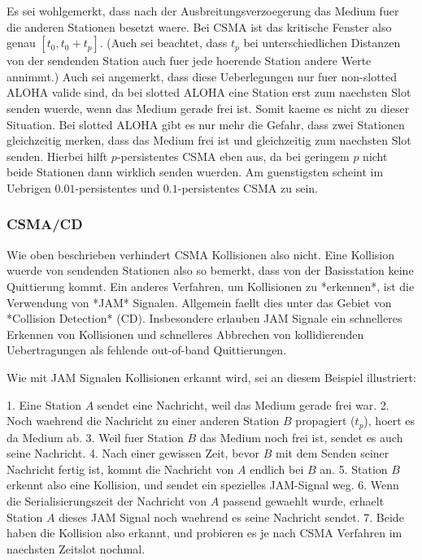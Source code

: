 Es sei wohlgemerkt, dass nach der Ausbreitungsverzoegerung das Medium fuer die
anderen Stationen besetzt waere. Bei CSMA ist das kritische Fenster also genau
$[t_0, t_0 + t_p]$. (Auch sei beachtet, dass $t_p$ bei unterschiedlichen
Distanzen von der sendenden Station auch fuer jede hoerende Station andere Werte
annimmt.) Auch sei angemerkt, dass diese Ueberlegungen nur fuer non-slotted
ALOHA valide sind, da bei slotted ALOHA eine Station erst zum naechsten Slot
senden wuerde, wenn das Medium gerade frei ist. Somit kaeme es nicht zu dieser
Situation. Bei slotted ALOHA gibt es nur mehr die Gefahr, dass zwei Stationen
gleichzeitig merken, dass das Medium frei ist und gleichzeitig zum naechsten
Slot senden. Hierbei hilft $p$-persistentes CSMA eben aus, da bei geringem $p$
nicht beide Stationen dann wirklich senden wuerden. Am guenstigsten scheint im
Uebrigen $0.01$-persistentes und $0.1$-persistentes CSMA zu sein.

\subsubsection{CSMA/CD} 

Wie oben beschrieben verhindert CSMA Kollisionen also nicht. Eine Kollision
wuerde von sendenden Stationen also so bemerkt, dass von der Basisstation keine
Quittierung kommt. Ein anderes Verfahren, um Kollisionen zu *erkennen*, ist die
Verwendung von *JAM* Signalen. Allgemein faellt dies unter das Gebiet von
*Collision Detection* (CD). Insbesondere erlauben JAM Signale ein schnelleres
Erkennen von Kollisionen und schnelleres Abbrechen von kollidierenden
Uebertragungen als fehlende out-of-band Quittierungen.

Wie mit JAM Signalen Kollisionen erkannt wird, sei an diesem Beispiel illustriert:

1. Eine Station $A$ sendet eine Nachricht, weil das Medium gerade frei war.
2. Noch waehrend die Nachricht zu einer anderen Station $B$ propagiert ($t_p$),
   hoert es da Medium ab.
3. Weil fuer Station $B$ das Medium noch frei ist, sendet es auch seine
   Nachricht.
4. Nach einer gewissen Zeit, bevor $B$ mit dem Senden seiner Nachricht fertig
   ist, kommt die Nachricht von $A$ endlich bei $B$ an.
5. Station $B$ erkennt also eine Kollision, und sendet ein spezielles JAM-Signal
   weg.
6. Wenn die Serialisierungszeit der Nachricht von $A$ passend gewaehlt wurde,
   erhaelt Station $A$ dieses JAM Signal noch waehrend es seine Nachricht
   sendet.
7. Beide haben die Kollision also erkannt, und probieren es je nach CSMA
   Verfahren im naechsten Zeitslot nochmal.

